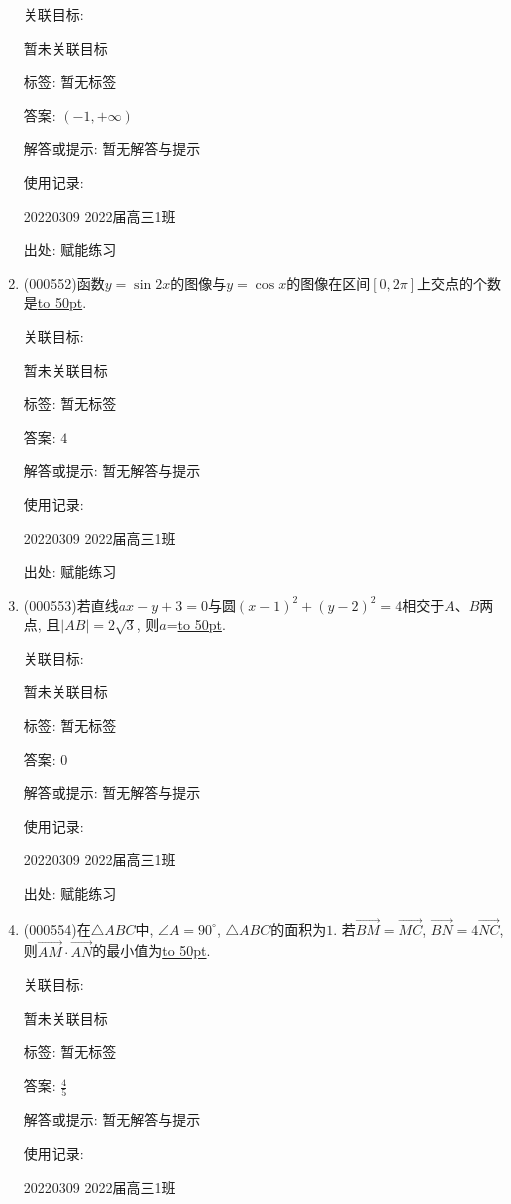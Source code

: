 \documentclass[10pt,a4paper]{article}
\newcommand{\blank}[1]{\underline{\hbox to #1pt{}}}
\begin{document}
\begin{enumerate}[1.]
关联目标:

暂未关联目标



标签: 暂无标签

答案: $(-1,+\infty)$

解答或提示: 暂无解答与提示

使用记录:

20220309	2022届高三1班	


出处: 赋能练习
\item { (000552)}函数$y=\sin 2x$的图像与$y=\cos x$的图像在区间$[0,2\pi]$上交点的个数是\blank{50}.


关联目标:

暂未关联目标



标签: 暂无标签

答案: $4$

解答或提示: 暂无解答与提示

使用记录:

20220309	2022届高三1班	


出处: 赋能练习
\item { (000553)}若直线$ax-y+3=0$与圆$(x-1)^2+(y-2)^2=4$相交于$A$、$B$两点, 且$|AB|=2 \sqrt3$, 则$a$=\blank{50}.


关联目标:

暂未关联目标



标签: 暂无标签

答案: $0$

解答或提示: 暂无解答与提示

使用记录:

20220309	2022届高三1班	


出处: 赋能练习
\item { (000554)}在$\triangle ABC$中, $\angle A=90^\circ $, $\triangle ABC$的面积为$1$. 若$\overrightarrow{BM}=\overrightarrow{MC}$, $\overrightarrow{BN}=4 \overrightarrow{NC}$, 则$\overrightarrow{AM}\cdot \overrightarrow{AN}$的最小值为\blank{50}.


关联目标:

暂未关联目标



标签: 暂无标签

答案: $\frac 45$

解答或提示: 暂无解答与提示

使用记录:

20220309	2022届高三1班	



\end{enumerate}
\end{document}
